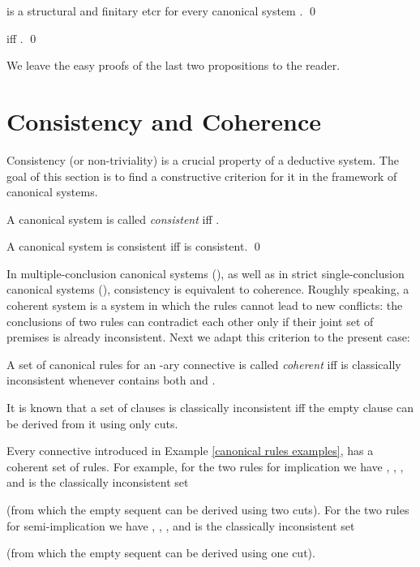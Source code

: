 \documentclass{LMCS}
\theoremstyle{remark}
\begin{document}
\begin{prop}
\label{structural finitary}
 is a structural and finitary etcr
for every canonical system .
\qed
\end{prop}

\begin{prop}
\label{reduction1}
 iff
.
\qed
\end{prop}

We leave the easy proofs of the last two propositions to the reader.

\section{Consistency and Coherence}

Consistency (or non-triviality) is a crucial property of a deductive system. 
The goal of this section is to find a constructive criterion
for it in the framework of canonical systems.

\begin{defi}
\label{consistency}
A canonical system  is called {\em consistent} iff .
\end{defi}

\begin{prop}
\label{consistent proposition}
A canonical system  is consistent iff  is consistent.
\qed
\end{prop}

In multiple-conclusion canonical systems (\cite{AL05}), as well as in strict
single-conclusion  canonical systems (\cite{AL10}), consistency is equivalent to
coherence. Roughly speaking, a coherent system is a system in
which the rules cannot lead to new conflicts: the conclusions of
two rules can contradict each other only if their joint set of
premises is already inconsistent.  Next we
adapt this criterion to the present case:

\begin{defi}
\label{coherent-connective}
A set  of canonical rules for an -ary connective 
is called {\em coherent} iff 
 is classically inconsistent
whenever  contains 
both 
and . 
\end{defi}

\begin{rem}
It is known that a set of clauses is classically inconsistent
iff the empty clause can be derived from it using only cuts.
\end{rem}

\begin{exa}
Every connective introduced in Example \ref{canonical rules examples}, has a coherent set of rules.
For example, for the two rules
for implication we have , ,
, and
 is the classically inconsistent set
 
(from which the empty sequent can be derived using two cuts). 
For the two rules
for semi-implication we have , ,
, and
 is the classically inconsistent set
 
(from which the empty sequent can be derived using one cut). 
\end{exa}
\end{document}
